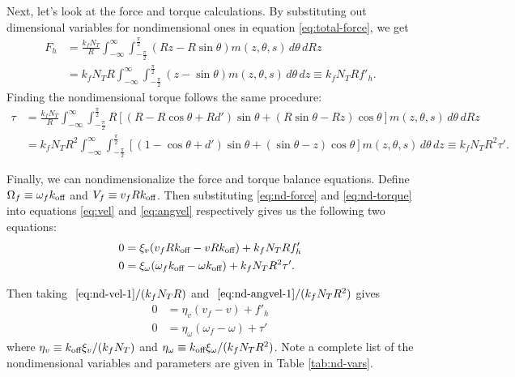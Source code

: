 \documentclass{article}
\newcommand{\dd}{d}
\newcommand{\Int}[4]{\int_{#3}^{#4} #1 \, \dd #2}
\newcommand{\tn}{\textnormal}
\begin{document}
Next, let's look at the force and torque calculations. By substituting
out dimensional variables for nondimensional ones in equation
\eqref{eq:total-force}, we get
\begin{align}
  \nonumber
  F_h &= \frac{k_f N_T}{R} \Int{\Int{(Rz - R\sin\theta) m(z, \theta,
      s)}{\theta}{-\frac{\pi}{2}}{\frac{\pi}{2}}
  }{Rz}{-\infty}{\infty} \\
  \label{eq:nd-force}
      &= k_f N_T R \Int{\Int{(z - \sin\theta) m(z, \theta, s)}
        {\theta}{-\frac{\pi}{2}}{\frac{\pi}{2}}}{z}{-\infty}{\infty}
        \equiv k_f N_T R f'_h.
\end{align}
Finding the nondimensional torque follows the same procedure:
\begin{align}
  \nonumber
  \tau &= \frac{k_f N_T}{R} \Int{\Int{R \left[(R - R\cos\theta + R
         d')\sin\theta + (R\sin\theta - R z)\cos\theta \right] m(z,
         \theta, s)}{\theta}{-\frac{\pi}{2}}{\frac{\pi}{2}}}
         {Rz}{-\infty}{\infty} \\
  \label{eq:nd-torque}
       &= k_f N_T R^2 \Int{\Int{\left[(1 - \cos\theta + d')\sin\theta +
         (\sin\theta - z)\cos\theta \right] m(z, \theta,
         s)}{\theta}{-\frac{\pi}{2}}{\frac{\pi}{2}}}
         {z}{-\infty}{\infty} \equiv k_f N_T R^2 \tau'.
\end{align}

Finally, we can nondimensionalize the force and torque balance
equations. Define $\Omega_f \equiv \omega_f k_\tn{off}$ and $V_f
\equiv v_f R k_\tn{off}$. Then substituting \eqref{eq:nd-force} and
\eqref{eq:nd-torque} into equations \eqref{eq:vel} and \eqref{eq:angvel}
respectively gives us the following two equations: 
\begin{align}
  \label{eq:nd-vel-1}
  0 &= \xi_v (v_f R k_\tn{off} - v R k_\tn{off}) + k_f N_T R f'_h \\
  \label{eq:nd-angvel-1}
  0 &= \xi_\omega (\omega_f k_\tn{off} - \omega k_\tn{off}) + k_f N_T
      R^2 \tau'.
\end{align}

Then taking $~\eqref{eq:nd-vel-1}/(k_f N_T R)$ and
$~\eqref{eq:nd-angvel-1}/(k_f N_T R^2)$ gives 
\begin{align}
  \label{eq:nd-vel}
  0 &= \eta_v (v_f - v) + f'_h \\
  \label{eq:nd-angvel}
  0 &= \eta_\omega (\omega_f - \omega) + \tau'
\end{align}
where $\eta_v \equiv k_\tn{off} \xi_v / (k_f N_T)$ and $\eta_\omega
\equiv k_\tn{off} \xi_\omega / (k_f N_T R^2)$. Note a complete list of
the nondimensional variables and parameters are given in Table
\ref{tab:nd-vars}.
\end{document}
